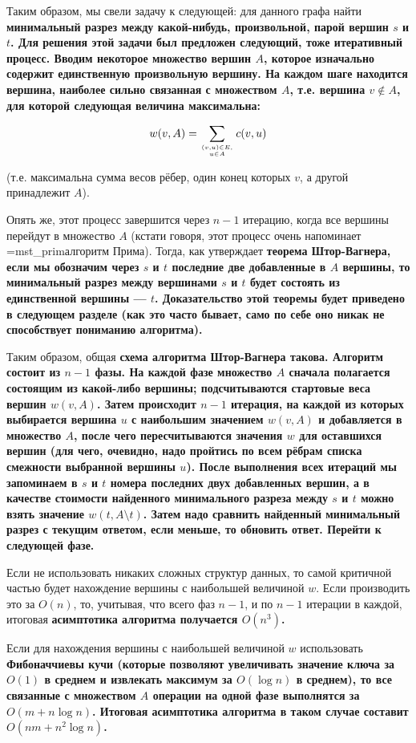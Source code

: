 Таким образом, мы свели задачу к следующей: для данного графа найти \bf{минимальный разрез между какой-нибудь, произвольной, парой вершин} $s$ и $t$. Для решения этой задачи был предложен следующий, тоже итеративный процесс. Вводим некоторое множество вершин $A$, которое изначально содержит единственную произвольную вершину. На каждом шаге находится вершина, \bf{наиболее сильно связанная} с множеством $A$, т.е. вершина $v \not\in A$, для которой следующая величина максимальна:

$$ w(v,A) = \sum_{(v,u) \in E, \atop u \in A} c(v,u) $$

(т.е. максимальна сумма весов рёбер, один конец которых $v$, а другой принадлежит $A$).

Опять же, этот процесс завершится через $n-1$ итерацию, когда все вершины перейдут в множество $A$ (кстати говоря, этот процесс очень напоминает \algohref=mst_prim{алгоритм Прима}). Тогда, как утверждает \bf{теорема Штор-Вагнера}, если мы обозначим через $s$ и $t$ последние две добавленные в $A$ вершины, то минимальный разрез между вершинами $s$ и $t$ будет состоять из единственной вершины --- $t$. Доказательство этой теоремы будет приведено в следующем разделе (как это часто бывает, само по себе оно никак не способствует пониманию алгоритма).

Таким образом, общая \bf{схема алгоритма} Штор-Вагнера такова. Алгоритм состоит из $n-1$ фазы. На каждой фазе множество $A$ сначала полагается состоящим из какой-либо вершины; подсчитываются стартовые веса вершин $w(v,A)$. Затем происходит $n-1$ итерация, на каждой из которых выбирается вершина $u$ с наибольшим значением $w(v,A)$ и добавляется в множество $A$, после чего пересчитываются значения $w$ для оставшихся вершин (для чего, очевидно, надо пройтись по всем рёбрам списка смежности выбранной вершины $u$). После выполнения всех итераций мы запоминаем в $s$ и $t$ номера последних двух добавленных вершин, а в качестве стоимости найденного минимального разреза между $s$ и $t$ можно взять значение $w(t,A \setminus t)$. Затем надо сравнить найденный минимальный разрез с текущим ответом, если меньше, то обновить ответ. Перейти к следующей фазе.

Если не использовать никаких сложных структур данных, то самой критичной частью будет нахождение вершины с наибольшей величиной $w$. Если производить это за $O(n)$, то, учитывая, что всего фаз $n-1$, и по $n-1$ итерации в каждой, итоговая \bf{асимптотика алгоритма} получается $O(n^3)$.

Если для нахождения вершины с наибольшей величиной $w$ использовать \bf{Фибоначчиевы кучи} (которые позволяют увеличивать значение ключа за $O(1)$ в среднем и извлекать максимум за $O(\log n)$ в среднем), то все связанные с множеством $A$ операции на одной фазе выполнятся за $O(m + n \log n)$. Итоговая асимптотика алгоритма в таком случае составит $O(n m + n^2 \log n)$.


